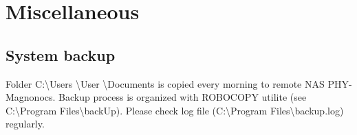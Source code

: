 \documentclass[14pt,a4paper] {article}
\begin{document}






\section{Miscellaneous}

\subsection{System backup}
 Folder C:\textbackslash Users \textbackslash User \textbackslash Documents is copied every morning to remote NAS PHY-Magnonocs.  
 Backup process is organized with ROBOCOPY utilite (see C:\textbackslash Program Files\textbackslash backUp). Please check log file (C:\textbackslash Program Files\textbackslash backup.log) regularly.
\end{document}
